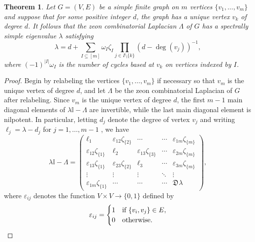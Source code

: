 \documentclass{article}
\newtheorem{theorem}{Theorem}[section]
\theoremstyle{definition}
\newcommand{\zdu}{\mathfrak{D}\mspace{1mu}}
\newcommand{\mI}{\mathbb{I}}
\numberwithin{equation}{section}
\begin{document}
\begin{theorem}\label{laplacian eigenvalue}
Let $G=(V,E)$ be a simple finite graph on $m$ vertices $\{v_1, \ldots, v_m\}$ and suppose that for some positive integer $d$, the graph has a unique vertex $v_k$ of degree $d$.  It follows that the zeon combinatorial Laplacian $\Lambda$ of $G$ has a spectrally simple eigenvalue $\lambda$ satisfying \begin{equation*}
\lambda = d + \sum_{I\subseteq [m]}\omega_I\zeta_{I}\prod_{j\in I\setminus\{k\}}(d-\deg(v_j))^{-1},
\end{equation*}
where $(-1)^{|I|}\omega_I$ is the number of cycles based at $v_k$ on vertices indexed by $I$.
\end{theorem}

\begin{proof}
Begin by relabeling the vertices $\{v_1, \ldots, v_m\}$ if necessary so that $v_m$ is the unique vertex of degree $d$, and let $\Lambda$ be the zeon combinatorial Laplacian of $G$ after relabeling.  Since $v_m$ is the unique vertex of degree $d$, the first $m-1$ main diagonal elements of $\lambda\mI-\Lambda$ are invertible, while the last main diagonal element is nilpotent.   In particular, letting $d_j$ denote the degree of vertex $v_j$ and writing $\ell_j=\lambda-d_j$ for $j=1, \ldots, m-1$  , we have
\begin{equation}\label{form to triangularize}
\lambda\mI-\Lambda=\left(\begin{matrix}
\ell_1&\varepsilon_{12}\zeta_{\{2\}}&\cdots&\cdots&\varepsilon_{1m}\zeta_{\{m\}}\\
\varepsilon_{12}\zeta_{\{1\}}&\ell_2&\varepsilon_{13}\zeta_{\{3\}}&\cdots&\varepsilon_{2m}\zeta_{\{m\}}\\
\varepsilon_{13}\zeta_{\{1\}}&\varepsilon_{23}\zeta_{\{2\}}&\ell_3&\cdots&\varepsilon_{3m}\zeta_{\{m\}}\\
\vdots&\vdots&\vdots&\ddots&\vdots\\
\varepsilon_{1m}\zeta_{\{1\}}&\cdots&\cdots&\cdots&\zdu \lambda
\end{matrix}\right),  
 \end{equation}
where $\varepsilon_{ij}$ denotes the function $V\times V\to \{0,1\}$ defined by 
\begin{equation*}
\varepsilon_{ij}=\begin{cases}
1&\text{\rm if }\{v_i,v_j\}\in E,\\
0&\text{\rm otherwise.}
\end{cases}
\end{equation*}



\end{proof}
\end{document}
